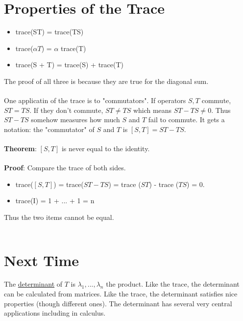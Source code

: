 \documentclass{article}
\begin{document}
\section{Properties of the Trace}
\begin{itemize}
    \item trace(ST) = trace(TS) 
    \item trace($\alpha T$) = $\alpha$ trace(T)
    \item trace(S + T) = trace(S) + trace(T) 
\end{itemize}
The proof of all three is because they are true for the diagonal sum. \\\\
One applicatin of the trace is to "commutators". If operators $S,T$ commute, $ST = TS$. If they don't commute, $ST \neq TS$ which means $ST - TS \neq 0$. Thus $ST - TS$ somehow measures how much $S$ and $T$ fail to commute. It gets a notation: the "commutator" of $S$ and $T$ is $[S,T] = ST - TS$. \\\\
\textbf{Theorem}: $[S,T]$ is never equal to the identity. \\\\
\textbf{Proof}: Compare the trace of both sides.
\begin{itemize} 
\item trace($[S,T]$) = trace($ST - TS$) = trace ($ST$) - trace ($TS$) = 0.
\item trace(I) = 1 + ... + 1 = n
\end{itemize}
Thus the two items cannot be equal. \\\\
\section{Next Time}
The \underline{determinant} of $T$ is $\lambda_1, ..., \lambda_n$ the product. Like the trace, the determinant can be calculated from matrices. Like the trace, the determinant satisfies nice properties (though different ones). The determinant has several very central applications including in calculus. 
\end{document}
